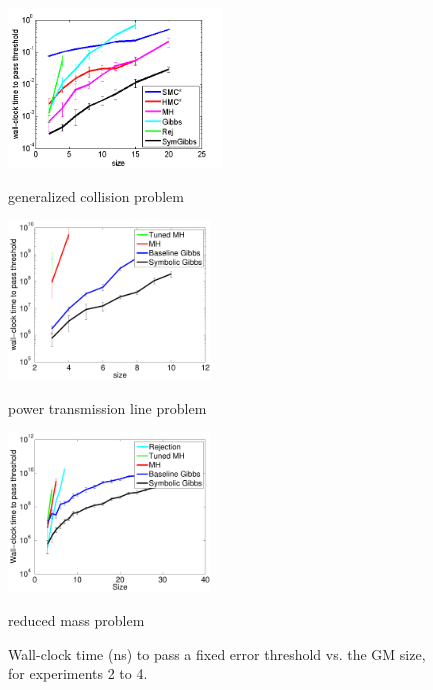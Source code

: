 \documentclass{article}
\begin{document}


\begin{figure}
\begin{center}
\begin{minipage}[b]{0.33\textwidth}
 \includegraphics[width=1\linewidth, height=120pt]{plots/collision/collisionTimeVsSize.png}
\caption{generalized collision problem}
\label{fig:err-threshold-vs-size-collision}
\end{minipage}
%
\begin{minipage}[b]{0.33\textwidth}
\includegraphics[width=1\linewidth, height=120pt]{Figs/plots/fermentation/time_vs_param-errorbar.pdf}
\caption{power transmission line problem}
\label{fig:err-threshold-vs-size-alc}
\end{minipage}
\begin{minipage}[b]{0.33\textwidth}
\includegraphics[width=1\linewidth, height=120pt]{Figs/plots/circuits/time_vs_param-errorbar.pdf}
\caption{reduced mass problem}
\label{fig:err-threshold-vs-size-circuit}
\end{minipage}
\end{center}
\caption{Wall-clock time (ns) to pass a fixed error threshold vs. the GM size, for experiments 2 to 4.}
\end{figure}
\end{document}
